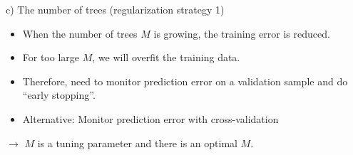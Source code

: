\documentclass[
  10pt,
  ignorenonframetext,
]{beamer}
\providecommand{\tightlist}{%
  \setlength{\itemsep}{0pt}\setlength{\parskip}{0pt}}
\begin{document}
\begin{frame}
\begin{block}{c) The number of trees (regularization strategy 1)}
\label{c-the-number-of-trees-regularization-strategy-1}
\(~\)

\begin{itemize}
\tightlist
\item
  When the number of trees \(M\) is growing, the training error is
  reduced.
\end{itemize}

\vspace{2mm}

\begin{itemize}
\tightlist
\item
  For too large \(M\), we will overfit the training data.
\end{itemize}

\vspace{2mm}

\begin{itemize}
\tightlist
\item
  Therefore, need to monitor prediction error on a validation sample and
  do ``early stopping''.
\end{itemize}

\vspace{2mm}

\begin{itemize}
\tightlist
\item
  Alternative: Monitor prediction error with cross-validation
\end{itemize}

\vspace{6mm}

\(\rightarrow\) \(M\) is a tuning parameter and there is an optimal
\(M\).
\end{block}
\end{frame}
\end{document}
